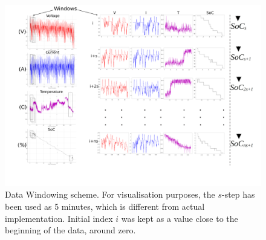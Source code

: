 %
%
\begin{landscape}
    \begin{figure}[ht]
        \centering
        \includegraphics[width=0.9\linewidth]{II_Body/images/Windowing4f-A3.jpg}
        \caption{Data Windowing scheme. For visualisation purposes, the $s$-step has been used as 5 minutes, which is different from actual implementation. Initial index $i$ was kept as a value close to the beginning of the data, around zero.}
        \label{fig:Windowing}
    \end{figure}
\end{landscape}